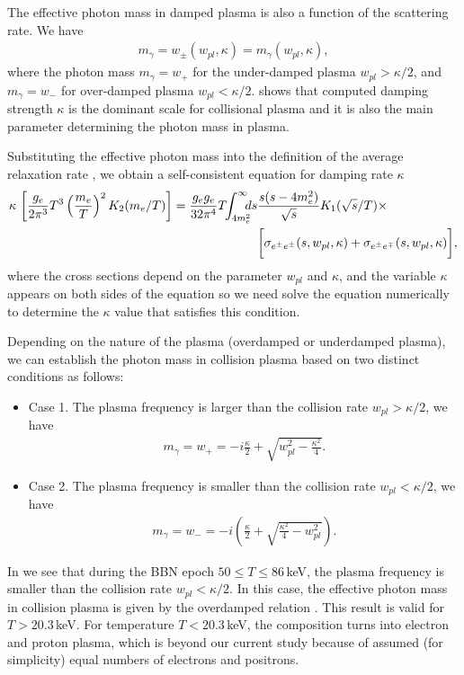 The effective photon mass in damped plasma is also a function of the scattering rate. We have
\begin{align}\label{PhotonMass:self}
m_\gamma=w_\pm(w_{pl},\kappa)=m_\gamma(w_{pl},\kappa),
\end{align}
where the photon mass $m_\gamma=w_+$ for the under-damped plasma $w_{pl}>\kappa/2$, and $m_\gamma=w_-$ for over-damped plasma $w_{pl}<\kappa/2$.  shows that computed damping strength $\kappa$ is the dominant scale for collisional plasma and it is also the main parameter determining the photon mass in plasma. 

Substituting the effective photon mass  into the definition of the average relaxation rate , we obtain a self-consistent equation for damping rate $\kappa$ 
\begin{align}\label{RealaxtionSelf}
\kappa\,\left[\frac{g_e}{2\pi^3}T^3\left(\frac{m_e}{T}\right)^2K_2(m_e/T)\right]=\frac{g_eg_e}{32\pi^4}T\!\! \int_{4m_e^2}^\infty\!\!\!\!ds&
\frac{s(s-4m^2_e)}{\sqrt{s}}K_1(\sqrt{s}/T)\times\\&\notag
\bigg[\sigma_{e^\pm e^\pm}(s,w_{pl},\kappa)+\sigma_{e^\pm e^\mp}(s,w_{pl},\kappa)\bigg],
\end{align}
where the cross sections depend on the parameter $w_{pl}$ and $\kappa$, and the variable $\kappa$ appears on both sides of the equation so we need solve the equation numerically to determine the $\kappa$ value that satisfies this condition.

Depending on the nature of the plasma (overdamped or underdamped plasma), we can establish the photon mass in collision plasma based on two distinct conditions as follows:
\begin{itemize}
\item Case 1. The plasma frequency is larger than the collision rate $w_{pl}>\kappa/2$, we have
\begin{align}
m_\gamma=w_+=-i\frac{\kappa}{2}+\sqrt{w^2_{pl}-\frac{\kappa^2}{4}}.
\end{align}
\item Case 2. The plasma frequency is smaller than the collision rate $w_{pl}<\kappa/2$, we have
\begin{align}\label{PhotonMassPlasma}
m_\gamma=w_-=-i\left(\frac{\kappa}{2}+\sqrt{\frac{\kappa^2}{4}-w^2_{pl}}\right).
\end{align}
\end{itemize}
In  we see that during the BBN epoch $50\leqslant T\leqslant 86$\,keV, the plasma frequency is smaller than the collision rate $w_{pl}<\kappa/2$. In this case, the effective photon mass in collision plasma is given by the overdamped relation . This result is valid for $T>20.3$\,keV. For temperature $T<20.3$\,keV, the composition turns into electron and proton plasma, which is beyond our current study because of assumed (for simplicity) equal numbers of electrons and positrons.

